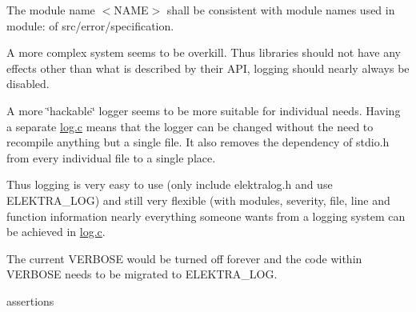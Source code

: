 The module name {\ttfamily $<$N\+A\+ME$>$} shall be consistent with module names used in {\ttfamily module\+:} of {\ttfamily src/error/specification}.

A more complex system seems to be overkill. Thus libraries should not have any effects other than what is described by their A\+PI, logging should nearly always be disabled.

A more \char`\"{}hackable\char`\"{} logger seems to be more suitable for individual needs. Having a separate {\ttfamily \hyperlink{log_8c}{log.\+c}} means that the logger can be changed without the need to recompile anything but a single file. It also removes the dependency of {\ttfamily stdio.\+h} from every individual file to a single place.

Thus logging is very easy to use (only include {\ttfamily elektralog.\+h} and use {\ttfamily E\+L\+E\+K\+T\+R\+A\+\_\+\+L\+OG}) and still very flexible (with modules, severity, file, line and function information nearly everything someone wants from a logging system can be achieved in {\ttfamily \hyperlink{log_8c}{log.\+c}}.

The current V\+E\+R\+B\+O\+SE would be turned off forever and the code within V\+E\+R\+B\+O\+SE needs to be migrated to {\ttfamily E\+L\+E\+K\+T\+R\+A\+\_\+\+L\+OG}.


\begin{DoxyItemize}
\item assertions
\end{DoxyItemize}